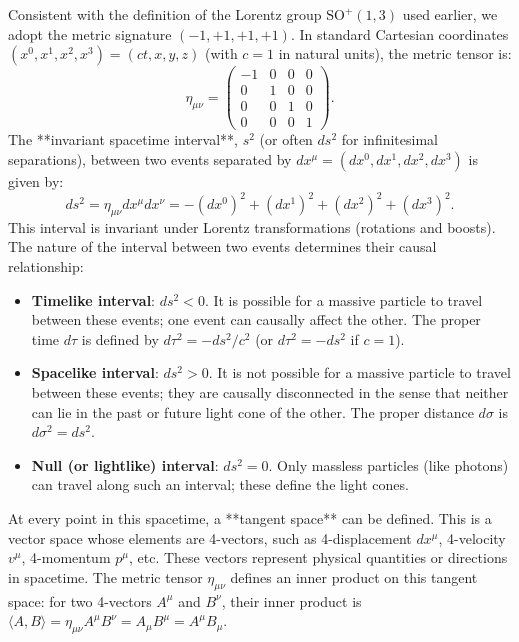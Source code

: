\documentclass{amsart}
\theoremstyle{definition}
\theoremstyle{remark}
\begin{document}
Consistent with the definition of the Lorentz group $\mathrm{SO}^+(1,3)$ used earlier, we adopt the metric signature $(-1, +1, +1, +1)$. In standard Cartesian coordinates $(x^0, x^1, x^2, x^3) = (ct, x, y, z)$ (with $c=1$ in natural units), the metric tensor is:
\begin{equation*}
\eta_{\mu\nu} = \begin{pmatrix} -1 & 0 & 0 & 0 \\ 0 & 1 & 0 & 0 \\ 0 & 0 & 1 & 0 \\ 0 & 0 & 0 & 1 \end{pmatrix}.
\end{equation*}
The **invariant spacetime interval**, $s^2$ (or often $ds^2$ for infinitesimal separations), between two events separated by $dx^\mu = (dx^0, dx^1, dx^2, dx^3)$ is given by:
\begin{equation*}
ds^2 = \eta_{\mu\nu} dx^\mu dx^\nu = -(dx^0)^2 + (dx^1)^2 + (dx^2)^2 + (dx^3)^2.
\end{equation*}
This interval is invariant under Lorentz transformations (rotations and boosts). The nature of the interval between two events determines their causal relationship:
\begin{itemize}
    \item \textbf{Timelike interval}: $ds^2 < 0$. It is possible for a massive particle to travel between these events; one event can causally affect the other. The proper time $d\tau$ is defined by $d\tau^2 = -ds^2/c^2$ (or $d\tau^2 = -ds^2$ if $c=1$).
    \item \textbf{Spacelike interval}: $ds^2 > 0$. It is not possible for a massive particle to travel between these events; they are causally disconnected in the sense that neither can lie in the past or future light cone of the other. The proper distance $d\sigma$ is $d\sigma^2 = ds^2$.
    \item \textbf{Null (or lightlike) interval}: $ds^2 = 0$. Only massless particles (like photons) can travel along such an interval; these define the light cones.
\end{itemize}

At every point in this spacetime, a **tangent space** can be defined. This is a vector space whose elements are 4-vectors, such as 4-displacement $dx^\mu$, 4-velocity $v^\mu$, 4-momentum $p^\mu$, etc. These vectors represent physical quantities or directions in spacetime. The metric tensor $\eta_{\mu\nu}$ defines an inner product on this tangent space: for two 4-vectors $A^\mu$ and $B^\nu$, their inner product is $\langle A, B \rangle = \eta_{\mu\nu} A^\mu B^\nu = A_\mu B^\mu = A^\mu B_\mu$.
\end{document}
